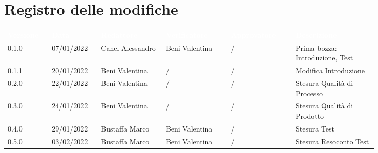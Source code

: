 \section*{Registro delle modifiche}

{\renewcommand{\arraystretch}{1.5}
\scriptsize
\begin{tabular}{p{0.10\linewidth}p{0.10\linewidth}p{0.15\linewidth}p{0.15\linewidth}p{0.15\linewidth}p{0.19\linewidth}}
	\rowcolor[RGB]{33, 73, 50}
	\textcolor{white}{\textbf{Versione}} & \textcolor{white}{\textbf{Data}} &
	\textcolor{white}{\textbf{Redattore}} & \textcolor{white}{\textbf{Verificatore}} &
	\textcolor{white}{\textbf{Approvatore}} & \textcolor{white}{\textbf{Descrizione}}\\
	\rowcolor[RGB]{216, 235, 171}
	0.1.0 & 07/01/2022 & Canel Alessandro& Beni Valentina &/& Prima bozza: Introduzione, Test\\
	\rowcolor[RGB]{233, 245, 206}
	0.1.1 & 20/01/2022 & Beni Valentina& / &/& Modifica Introduzione\\
	\rowcolor[RGB]{216, 235, 171}
	0.2.0 & 22/01/2022 & Beni Valentina& / &/& Stesura Qualità di Processo\\
	\rowcolor[RGB]{233, 245, 206}
	0.3.0 & 24/01/2022 & Beni Valentina& / &/& Stesura Qualità di Prodotto\\
	\rowcolor[RGB]{216, 235, 171}
	0.4.0 & 29/01/2022 & Bustaffa Marco& Beni Valentina &/& Stesura Test\\
	\rowcolor[RGB]{233, 245, 206}
	0.5.0 & 03/02/2022 & Bustaffa Marco& Beni Valentina &/& Stesura Resoconto Test\\
\end{tabular}
}
